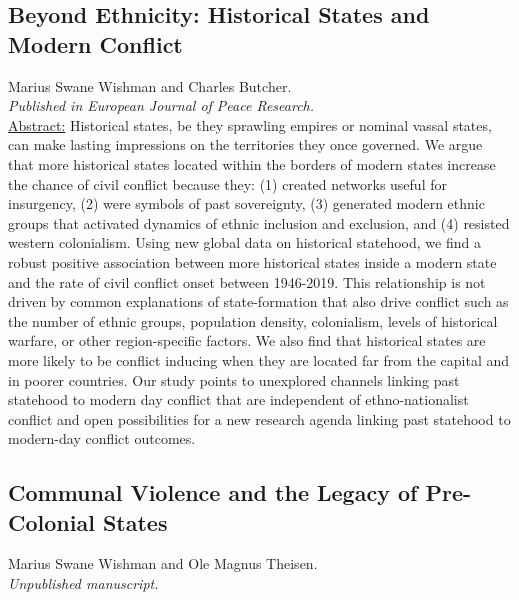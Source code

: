 \documentclass[12pt]{article}
\begin{document}
\subsection*{Beyond Ethnicity: Historical States and Modern Conflict}

Marius Swane Wishman and Charles Butcher.\\

\textit{Published in European Journal of Peace Research.}\\

\underline{Abstract:} Historical states, be they sprawling empires or nominal
vassal states, can make lasting impressions on the territories they once
governed. We argue that more historical states located within the borders of
modern states increase the chance of civil conflict because they: (1) created
networks useful for insurgency, (2) were symbols of past sovereignty, (3)
generated modern ethnic groups that activated dynamics of ethnic inclusion and
exclusion, and (4) resisted western colonialism. Using new global data on
historical statehood, we find a robust positive association between more
historical states inside a modern state and the rate of civil conflict onset
between 1946-2019. This relationship is not driven by common explanations of
state-formation that also drive conflict such as the number of ethnic groups,
population density, colonialism, levels of historical warfare, or other
region-specific factors. We also find that historical states are more likely to
be conflict inducing when they are located far from the capital and in poorer
countries. Our study points to unexplored channels linking past statehood to
modern day conflict that are independent of ethno-nationalist conflict and open
possibilities for a new research agenda linking past statehood to modern-day
conflict outcomes.

\subsection*{Communal Violence and the Legacy of Pre-Colonial States}

Marius Swane Wishman and Ole Magnus Theisen.\\

\textit{Unpublished manuscript.}\\
\end{document}
